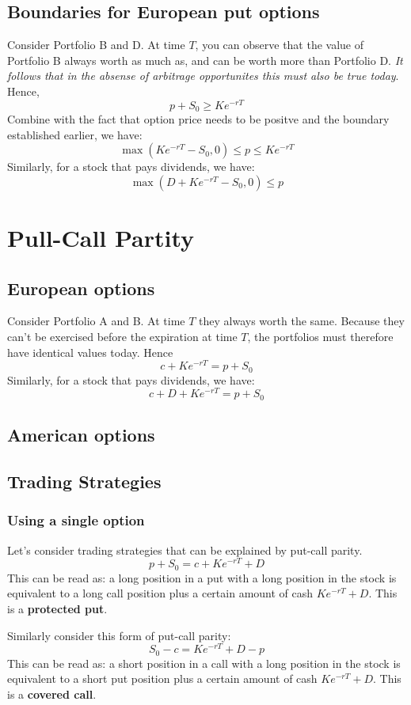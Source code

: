 \documentclass{article}
\begin{document}
\subsection{Boundaries for European put options}
Consider Portfolio B and D. At time $T$, you can observe that the value 
of Portfolio B always worth as much as, and can be worth more than
Portfolio D. \textit{It follows that in the absense of arbitrage opportunites
this must also be true today}. Hence,
\[
p + S_0 \ge Ke^{-rT}
\]
Combine with the fact that option price needs to be positve and the boundary
established earlier, we have:
\[
\max(Ke^{-rT} - S_0, 0) \le p \le Ke^{-rT}
\]
Similarly, for a stock that pays dividends, we have:
\[
\max(D + Ke^{-rT} - S_0, 0) \le p
\]

\section{Pull-Call Partity}
\subsection{European options}
Consider Portfolio A and B. At time $T$ they always worth the same. Because
they can't be exercised before the expiration at time $T$, the portfolios must
therefore have identical values today. Hence
\[
c + Ke^{-rT} = p + S_0
\]
Similarly, for a stock that pays dividends, we have:
\[
c + D + Ke^{-rT} = p + S_0
\]

\subsection{American options}

\subsection{Trading Strategies}
\subsubsection{Using a single option}
Let's consider trading strategies that can be explained by put-call parity.
\[
p + S_0 = c + Ke^{-rT} + D
\]
This can be read as: a long position in a put with a long position in the stock is
equivalent to a long call position plus a certain amount of cash $Ke^{-rT} + D$.
This is a \textbf{protected put}.

Similarly consider this form of put-call parity:
\[
S_0 - c = Ke^{-rT} + D - p
\]
This can be read as: a short position in a call with a long position in the stock is
equivalent to a short put position plus a certain amount of cash $Ke^{-rT} + D$. 
This is a \textbf{covered call}. 
\end{document}
